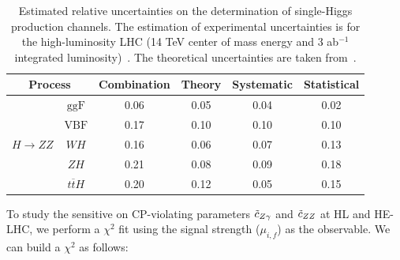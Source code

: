 \begin{table}
	\begin{center}
		\begin{tabular}{lc|cccc}
			\multicolumn{2}{c|}{Process}	 & Combination & Theory & Systematic & Statistical \\ \hline \hline
			\multirow{5}{*}{${H}\to {ZZ}$}   		&$\text{ggF}$& 0.06 & 0.05 & 0.04 & 0.02 \\
			&$\text{VBF}$& 0.17 & 0.10 & 0.10 & 0.10 \\
 			&${WH}$& 0.16 & 0.06 & 0.07 & 0.13 \\
 			&${ZH}$& 0.21 & 0.08 & 0.09 & 0.18 \\ 
 			&${t\overline tH}$& 0.20 & 0.12 & 0.05 & 0.15 \\ \hline
		\end{tabular}
		\caption{Estimated relative uncertainties on the determination of single-Higgs production channels. The 
		estimation of experimental uncertainties is for the high-luminosity LHC (14 TeV center of mass energy and 3 ab$^{-1}$ integrated luminosity)~\cite{}. The theoretical 
		uncertainties are taken from~\cite{}.}\label{tab:one}
	\end{center}
\end{table}


To study the sensitive on CP-violating parameters $\tilde c_{Z\gamma}$ and $\tilde c_{ZZ}$ at HL and HE-LHC, we perform a $\chi^2$ fit using 
the signal strength ($\mu_{i,f}$) as the observable. 
We can build a $\chi^2$  as follows:

